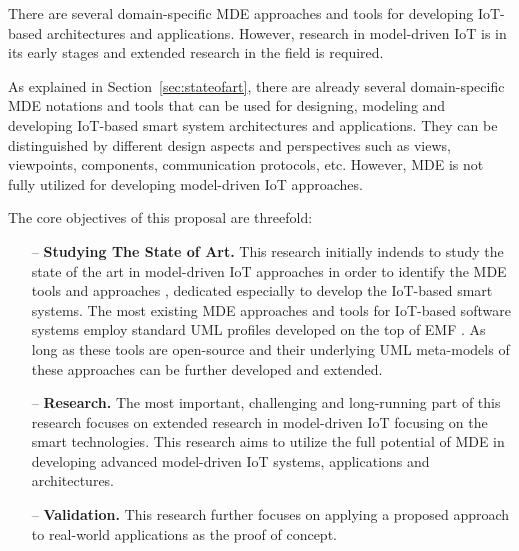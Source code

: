 There are several domain-specific MDE approaches and tools for developing IoT-based architectures and applications. However, research in model-driven IoT is in its early stages and extended research in the field is required. 

As explained in Section~\ref{sec:stateofart}, there are already several domain-specific MDE notations and tools that can be used for designing, modeling and developing IoT-based smart system architectures and applications. They can be distinguished by different design aspects and perspectives such as views, viewpoints, components, communication protocols, etc. However, MDE is not fully utilized for developing model-driven IoT approaches.

The core objectives of this proposal are threefold:
\begin{itemize}
\item[--] \textbf{Studying The State of Art.} This research initially indends to study the state of the art in model-driven IoT approaches in order to identify the MDE tools and approaches \cite{Fleurey+2011}, \cite{Corredor+2012} dedicated especially to develop the IoT-based smart systems. The most existing MDE approaches and tools for IoT-based software systems employ standard UML profiles developed on the top of EMF \cite{Steinberg+2008}. As long as these tools are open-source and their underlying UML meta-models of these approaches can be further developed and extended. 
\item[--] \textbf{Research.} The most important, challenging and long-running part of this research focuses on extended research in model-driven IoT focusing on the smart technologies. This research aims to utilize the full potential of MDE in developing advanced model-driven IoT systems, applications and architectures.
\item[--] \textbf{Validation.} This research further focuses on applying a proposed approach to real-world applications as the proof of concept.
\end{itemize}

 